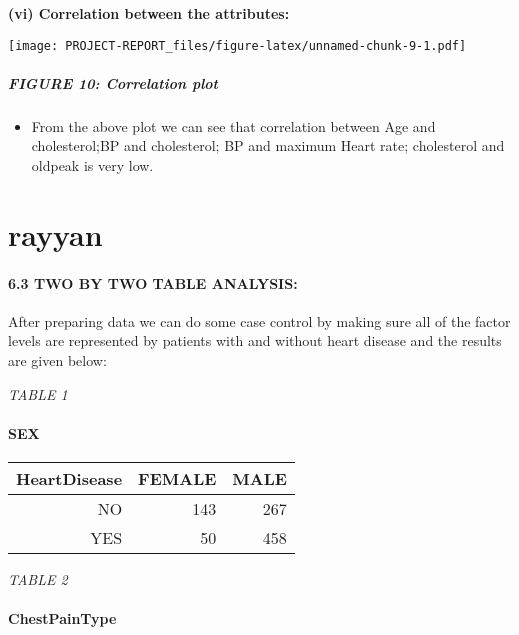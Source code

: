 \documentclass[
]{article}
\providecommand{\tightlist}{%
  \setlength{\itemsep}{0pt}\setlength{\parskip}{0pt}}
\begin{document}
\textbf{(vi) Correlation between the attributes:}

\texttt{[image: PROJECT-REPORT\_files/figure-latex/unnamed-chunk-9-1.pdf]}

\hypertarget{figure-10-correlation-plot}{%
\subparagraph{FIGURE 10: Correlation
plot}\label{figure-10-correlation-plot}}

\begin{itemize}
\tightlist
\item
  From the above plot we can see that correlation between Age and
  cholesterol;BP and cholesterol; BP and maximum Heart rate; cholesterol
  and oldpeak is very low.
\end{itemize}

\hypertarget{rayyan}{%
\section{rayyan}\label{rayyan}}

\hypertarget{two-by-two-table-analysis}{%
\paragraph{6.3 TWO BY TWO TABLE
ANALYSIS:}\label{two-by-two-table-analysis}}

After preparing data we can do some case control by making sure all of
the factor levels are represented by patients with and without heart
disease and the results are given below:

\emph{TABLE 1}

\hypertarget{sex}{%
\paragraph{SEX}\label{sex}}

\begin{longtable}[]{@{}rrr@{}}
\toprule\noalign{}
HeartDisease & FEMALE & MALE \\
\midrule\noalign{}
\endhead
\bottomrule\noalign{}
\endlastfoot
NO & 143 & 267 \\
YES & 50 & 458 \\
\end{longtable}

\emph{TABLE 2}

\hypertarget{chestpaintype}{%
\paragraph{ChestPainType}\label{chestpaintype}}
\end{document}
